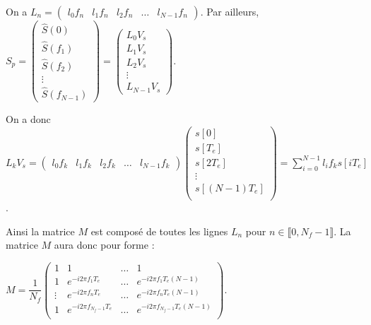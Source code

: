 \ifprof
\begin{corrige}
On a $L_n = \begin{pmatrix}  l_0 f_n  & l_1 f_n & l_2 f_n & \ldots & l_{N-1} f_n\end{pmatrix}$.
Par ailleurs, 
$S_p = 
\begin{pmatrix} \hat{S}\left( 0\right) \\ \hat{S}\left( f_1\right) \\ \hat{S}\left( f_2\right)  \\ \vdots \\ \hat{S}\left( f_{N-1}\right) \end{pmatrix} 
=
\begin{pmatrix} 
L_0 V_s \\
L_1 V_s \\
L_2 V_s \\
\vdots \\
 L_{N-1} V_s\end{pmatrix}$.

On a donc $ L_{k} V_s =\begin{pmatrix}  l_0 f_k  & l_1 f_k & l_2 f_k & \ldots & l_{N-1} f_k\end{pmatrix} \begin{pmatrix}
s[0]  \\ s[T_e] \\ s[2T_e] \\ \vdots \\ s\left[\left(N-1\right)T_e\right] \\   \end{pmatrix} = \sum  \limits_{i=0}^{N-1} l_i f_k s\left[i T_e\right]$.


Ainsi la matrice $M$ est composé de toutes les lignes $L_n$ pour $n\in  \llbracket 0,N_f-1\rrbracket$.
La matrice $M$ aura donc pour forme : 

$
M=\dfrac{1}{N_f}
\left(
\begin{array}{cccc}
1 & 1 & \ldots & 1 \\ 
1 & e^{-i2\pi f_1T_e} & \ldots & e^{-i2\pi f_{1}T_e(N-1)} \\ 
\vdots & e^{-i2\pi f_nT_e} & \ldots & e^{-i2\pi f_{n}T_e(N-1)} \\ 
1 & e^{-i2\pi f_{N_f-1}T_e} & \ldots & e^{-i2\pi f_{N_f-1}T_e(N-1)} \\ 
\end{array} 
\right)
$.
\end{corrige}
\else
\fi

